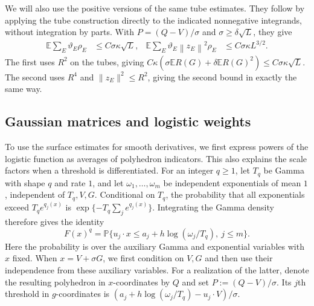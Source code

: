 \documentclass[11pt,letterpaper,twoside,leqno]{article}
\theoremstyle{bookplain}
\theoremstyle{bookremark}
\newcommand{\E}{\mathbb E}
\newcommand{\Pp}{\mathbb P}
\newcommand{\norm}[1]{\left\lVert#1\right\rVert}
\begin{document}
We will also use the positive versions of the same tube estimates.
They follow by applying the tube construction directly to the indicated
nonnegative integrands, without integration by parts. With $P=(Q-V)/\sigma$
and $\sigma\ge\delta\sqrt L$, they give
\begin{align}
 \E\sum_E\vartheta_E\rho_E&\le C\sigma\kappa\sqrt L,
 &\E\sum_E\vartheta_E\norm{z_E}^2\rho_E&\le C\sigma\kappa L^{3/2}.
 \label{hgap:eq:positive-edge}
\end{align}
The first uses $R^2$ on the tubes, giving
$C\kappa(\sigma\E R(G)+\delta\E R(G)^2)\le C\sigma\kappa\sqrt L$.
The second uses $R^4$ and $\|z_E\|^2\le R^2$, giving the second
bound in exactly the same way.

\subsection{Gaussian matrices and logistic weights}\label{hgap:sec:matrices}

To use the surface estimates for smooth derivatives, we first express
powers of the logistic function as averages of polyhedron indicators.
This also explains the scale factors when a threshold is differentiated.
For an integer
$q\ge1$, let $T_q$ be Gamma with shape $q$ and rate $1$, and let
$\omega_1,\ldots,\omega_m$ be independent exponentials of mean $1$,
independent of $T_q,V,G$. Conditional on $T_q$, the probability that all exponentials exceed
$T_qe^{q_j(x)}$ is $\exp\{-T_q\sum_j e^{q_j(x)}\}$. Integrating the
Gamma density therefore gives the identity
\begin{equation}
 F(x)^q=\Pp\{u_j\cdot x\le a_j+h\log(\omega_j/T_q),\ j\le m\}.
 \label{hgap:eq:mixture}
\end{equation}
Here the probability is over the auxiliary Gamma and exponential
variables with $x$ fixed. When $x=V+\sigma G$, we first condition on
$V,G$ and then use their independence from these auxiliary variables.
For a realization of the latter, denote the resulting polyhedron in
$x$-coordinates by $Q$ and set $P:=(Q-V)/\sigma$.
Its $j$th threshold in $g$-coordinates is
$(a_j+h\log(\omega_j/T_q)-u_j\cdot V)/\sigma$.
\end{document}
